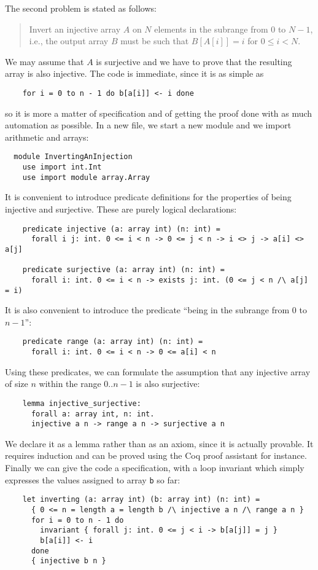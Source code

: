 The second problem is stated as follows:
\begin{quote}
  Invert an injective array $A$ on $N$ elements in the
  subrange from $0$ to $N - 1$, i.e., the output array $B$ must be
  such that $B[A[i]] = i$ for $0 \le i < N$.
\end{quote}
We may assume that $A$ is surjective and we have to prove
that the resulting array is also injective.
The code is immediate, since it is as simple as
\begin{verbatim}
    for i = 0 to n - 1 do b[a[i]] <- i done
\end{verbatim}
so it is more a matter of specification and of getting the proof done
with as much automation as possible. In a new file, we start a new
module and we import arithmetic and arrays:
\begin{verbatim}
  module InvertingAnInjection
    use import int.Int
    use import module array.Array
\end{verbatim}
It is convenient to introduce predicate definitions for the properties
of being injective and surjective. These are purely logical
declarations:
\begin{verbatim}
    predicate injective (a: array int) (n: int) =
      forall i j: int. 0 <= i < n -> 0 <= j < n -> i <> j -> a[i] <> a[j]

    predicate surjective (a: array int) (n: int) =
      forall i: int. 0 <= i < n -> exists j: int. (0 <= j < n /\ a[j] = i)
\end{verbatim}
It is also convenient to introduce the predicate ``being in the
subrange from 0 to $n-1$'':
\begin{verbatim}
    predicate range (a: array int) (n: int) =
      forall i: int. 0 <= i < n -> 0 <= a[i] < n
\end{verbatim}
Using these predicates, we can formulate the assumption that any
injective array of size $n$ within the range $0..n-1$ is also surjective:
\begin{verbatim}
    lemma injective_surjective:
      forall a: array int, n: int.
      injective a n -> range a n -> surjective a n
\end{verbatim}
We declare it as a lemma rather than as an axiom, since it is actually
provable. It requires induction and can be proved using the Coq proof
assistant for instance.
Finally we can give the code a specification, with a loop invariant
which simply expresses the values assigned to array \texttt{b} so far:
\begin{verbatim}
    let inverting (a: array int) (b: array int) (n: int) =
      { 0 <= n = length a = length b /\ injective a n /\ range a n }
      for i = 0 to n - 1 do
        invariant { forall j: int. 0 <= j < i -> b[a[j]] = j }
        b[a[i]] <- i
      done
      { injective b n }
\end{verbatim}
